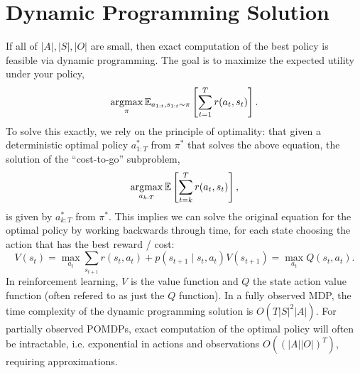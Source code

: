 \documentclass[11pt]{article}
\begin{document}
\section{Dynamic Programming Solution}
If all of $|A|,|S|,|O|$ are small, then exact computation of the best policy
is feasible via dynamic programming.
The goal is to maximize the expected utility under your policy,
\begin{equation}
    \operatorname*{argmax}_\pi \mathbb{E}_{a_{1:t},s_{1:t}\sim\pi}\left[\sum_{t=1}^T r(a_t, s_t)\right].
\end{equation}
To solve this exactly, we rely on the principle of optimality:
that given a deterministic optimal policy $a^*_{1:T}$ from $\pi^*$ that solves the
above equation, the solution of the ``cost-to-go'' subproblem,
\begin{equation}
    \operatorname*{argmax}_{a_{k:T}} \mathbb{E}\left[\sum_{t=k}^T r(a_t, s_t)\right],
\end{equation}
is given by $a^*_{k:T}$ from $\pi^*$.
This implies we can solve the original equation for the optimal policy by working backwards
through time, for each state choosing the action that has the best reward / cost:
\begin{equation}
    V(s_t) = \max_{a_t} \sum_{s_{t+1}}r(s_t, a_t) + p(s_{t+1} \mid s_t, a_t)V(s_{t+1})
    = \max_{a_t} Q(s_t, a_t).
\end{equation}
In reinforcement learning, $V$ is the value function and $Q$ the state action value function
(often refered to as just the $Q$ function).
In a fully observed MDP, the time complexity of the dynamic programming solution is $O(T|S|^2|A|)$.
For partially observed POMDPs, exact computation of the optimal policy will often be
intractable, i.e. exponential in actions and observations $O((|A||O|)^T)$,
requiring approximations.
\end{document}
